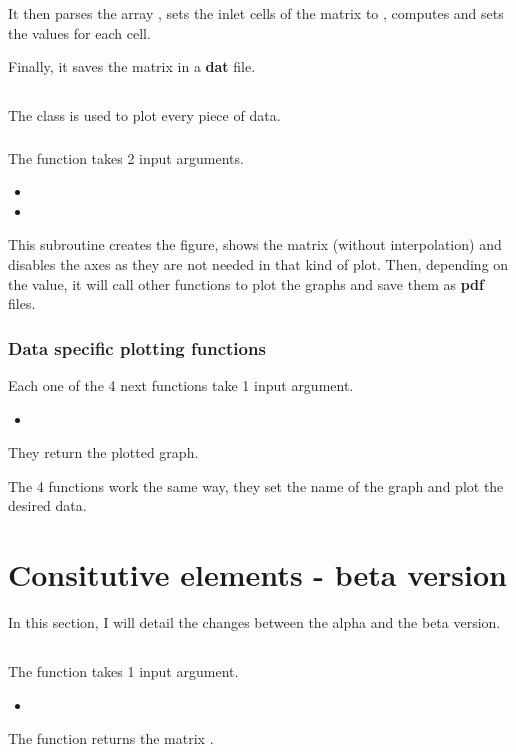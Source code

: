 It then parses the array , sets the inlet cells of the
 matrix to , computes and sets the values for
each cell.

Finally, it saves the matrix in a \textbf{dat} file.

\subsection{}
The class is used to plot every piece of data.

\subsubsection{\textcolor{func}{}}
The function  takes 2 input arguments.
\begin{itemize}
      \item {}
      \item {}
\end{itemize}
This subroutine creates the figure, shows the matrix  (without
interpolation) and disables the axes as they are not needed in that kind of
plot. Then, depending on the  value, it will call other 
functions to plot the graphs and save them as \textbf{pdf} files.

\subsubsection{Data specific plotting functions}
Each one of the 4 next functions take 1 input argument.
\begin{itemize}
      \item {}
\end{itemize}
They return the plotted graph.

The 4 functions work the same way, they set the name of the graph and plot the
desired data.

\section{Consitutive elements - beta version}
In this section, I will detail the changes between the alpha and the beta
version.

\subsection{}
\subsubsection{}
The function \textcolor{func}{} takes 1 input argument.
\begin{itemize}
      \item {} \textcolor{dtype}{}
\end{itemize}
The function returns the matrix .

